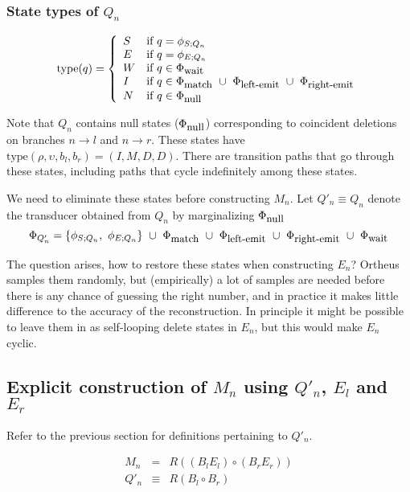 \documentclass{article}
\newcommand{\seclabel}[1]{\label{sec.#1}}
\newcommand\transequiv{\equiv}
\newcommand\compose{}
\newcommand\fork{\circ}
\newcommand\States{\Phi}
\newcommand\statesof[1]{\States_{#1}}
\newcommand\startstateof[1]{\phi_{S;#1}}
\newcommand\laststateof[1]{\phi_{E;#1}}
\newcommand\statetype{\mbox{type}}
\newcommand\stateset[1]{\statesof{\mbox{\small #1}}}
\newcommand\qstate{(\rho,\upsilon,b_l,b_r)}
\newcommand\matchsuffix{match}
\newcommand\nullsuffix{null}
\newcommand\leftemitsuffix{left-emit}
\newcommand\rightemitsuffix{right-emit}
\newcommand\qwaitsuffix{wait}
\newcommand\matchstates{\stateset{\matchsuffix}}
\newcommand\nullstates{\stateset{\nullsuffix}}
\newcommand\leftemitstates{\stateset{\leftemitsuffix}}
\newcommand\rightemitstates{\stateset{\rightemitsuffix}}
\newcommand\qwaitstates{\stateset{\qwaitsuffix}}
\begin{document}
\subsubsection{State types of $Q_n$}

\[
\statetype(q) = \left\{ \begin{array}{ll}
S & \mbox{if $q = \startstateof{Q_n}$} \\
E & \mbox{if $q = \laststateof{Q_n}$} \\
W & \mbox{if $q \in \qwaitstates$} \\
I & \mbox{if $q \in \matchstates\ \cup\ \leftemitstates\ \cup\ \rightemitstates$} \\
N & \mbox{if $q \in \nullstates$}
\end{array} \right.
\]

Note that $Q_n$ contains null states ($\nullstates$) corresponding to coincident deletions on branches $n \to l$ and $n \to r$.
These states have $\statetype\qstate=(I,M,D,D)$.
There are transition paths that go through these states, including paths that cycle indefinitely among these states.

We need to eliminate these states before constructing $M_n$.
Let $Q'_n \transequiv Q_n$ denote the transducer obtained from $Q_n$ by marginalizing $\nullstates$
\[
\statesof{Q'_n} = \{ \startstateof{Q_n},\ \laststateof{Q_n} \}\ \cup\ \matchstates\ \cup\ \leftemitstates\ \cup\ \rightemitstates\ \cup\ \qwaitstates
\]

The question arises, how to restore these states when constructing $E_n$?
Ortheus samples them randomly,
but (empirically) a lot of samples are needed before there is any chance of guessing the right number,
and in practice it makes little difference to the accuracy of the reconstruction.
In principle it might be possible to leave them in as self-looping delete states in $E_n$, but this would make $E_n$ cyclic.

\subsection{Explicit construction of $M_n$ using $Q'_n$, $E_l$ and $E_r$}
\seclabel{Mn}
Refer to the previous section for definitions pertaining to $Q'_n$.

\begin{eqnarray*}
M_n & = & R \compose ((B_l \compose E_l) \fork (B_r \compose E_r)) \\
Q'_n & \transequiv & R \compose (B_l \fork B_r)
\end{eqnarray*}
\end{document}
